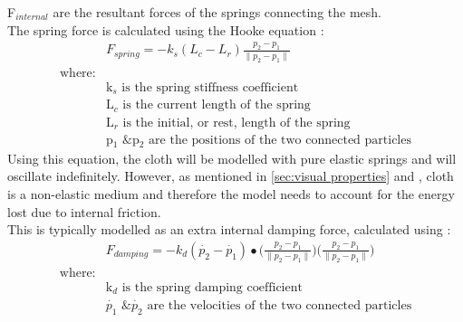 F$_{internal}$ are the resultant forces of the springs connecting the mesh.
\\The spring force is calculated using the Hooke equation \parencite[201]{Parent2012}:
\begin{equation}
\begin{split}
\label{eq:hooke equation}
  &F_{spring} = -k_{s}(L_{c}-L_{r})\frac{p_{2}-p_{1}}{\parallel p_{2}-p_{1}\parallel}
  \\\text{where:}
  \\&\text{k$_{s}$ is the spring stiffness coefficient}
  \\&\text{L$_{c}$ is the current length of the spring}
  \\&\text{L$_{r}$ is the initial, or rest, length of the spring}
  \\&\text{p$_{1}$ \& p$_{2}$ are the positions of the two connected particles}
\end{split}
\end{equation}
Using this equation, the cloth will be modelled with pure elastic springs and will oscillate indefinitely. However, as mentioned in \ref{sec:visual properties} and \textcite[1]{Provot2001}, cloth is a non-elastic medium and therefore the model needs to account for the energy lost due to internal friction.
\\This is typically modelled as an extra internal damping force, calculated using \parencite[201]{Parent2012}:
\begin{equation}
\begin{split}
\label{eq:spring damping}
  &F_{damping} = -k_{d}(\dot{p_{2}}-\dot{p_{1}})\bullet\bigg(\frac{p_{2}-p_{1}}{\parallel p_{2}-p_{1}\parallel}\bigg)\bigg(\frac{p_{2}-p_{1}}{\parallel p_{2}-p_{1}\parallel}\bigg)
  \\\text{where:}
  \\&\text{k$_{d}$ is the spring damping coefficient}
  \\&\text{$\dot{p_{1}}$ \& $\dot{p_{2}}$ are the velocities of the two connected particles}
\end{split}
\end{equation}

